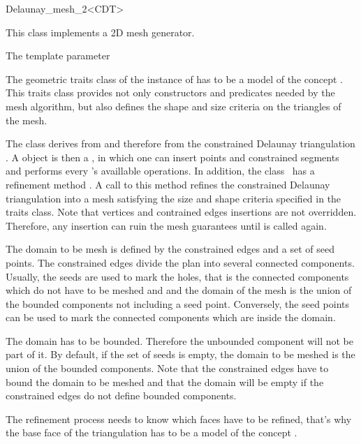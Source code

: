 \begin{ccRefClass}{Delaunay_mesh_2<CDT>}

This class implements a 2D mesh generator.

\ccParameters
The template parameter  \meshcdtrequires{}

The geometric traits class of the instance of  has to be
  a model of the concept . This traits class
  provides not only constructors and predicates needed by the mesh
  algorithm, but also defines the shape and size criteria on the
  triangles of the mesh.


The class \ccRefName{} derives from
   and therefore from
  the constrained Delaunay triangulation . A \ccRefName{}
  object is then a , in which one can insert points and
  constrained segments and performs every 's availlable
  operations. In addition, the class \ccRefName\ has a refinement
  method . A call to this method refines the
  constrained Delaunay triangulation into a mesh satisfying the size
  and shape criteria specified in the traits class. Note that vertices
  and contrained edges insertions are not overridden. Therefore, any
  insertion can ruin the mesh guarantees until  is
  called again.
  
  The domain to be mesh is defined by the constrained edges and a set
  of seed points. The constrained edges divide the plan into several
  connected components. Usually, the seeds are used to mark the holes,
  that is the connected components which do not have to be meshed and
  and the domain of the mesh is the union of the bounded components
  not including a seed point. Conversely, the seed points can be used
  to mark the connected components which are inside the domain.
  
  The domain has to be bounded. Therefore the unbounded component will
  not be part of it. By
  default, if the set of seeds is empty, the domain to be meshed is
  the union of the bounded components. Note that the constrained edges
  have to bound the domain to be meshed and that the domain will be
  empty if the constrained edges do not define bounded components.

The refinement process needs to know which faces have to be
  refined, that's why the base face of the triangulation  has
  to be a model of the concept .


\end{ccRefClass}
